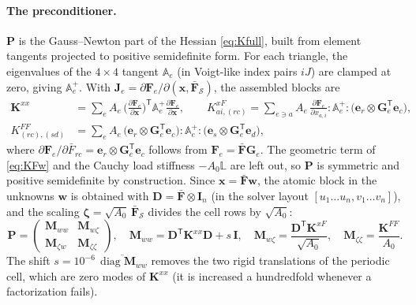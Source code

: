 \documentclass[11pt,a4paper]{article}
\newcommand{\Fb}{\bar{\mathbf F}}
\newcommand{\F}{\mathbf F}
\newcommand{\I}{\mathbf I}
\newcommand{\x}{\mathbf x}
\newcommand{\w}{\mathbf w}
\newcommand{\G}{\mathbf G}
\begin{document}
\paragraph{The preconditioner.}
\(\mathbf P\) is the Gauss--Newton part of the Hessian \eqref{eq:Kfull}, built from element tangents
projected to positive semidefinite form. For each triangle, the eigenvalues of the \(4\times4\)
tangent \(\mathbb A_e\) (in Voigt-like index pairs \(iJ\)) are clamped at zero, giving \(\mathbb A^+_e\).
With \(\mathbf J_e=\partial\F_e/\partial(\x,\Fb_{\mathcal S})\), the assembled blocks are
\begin{align}
  \mathbf K^{xx}&=\sum_eA_e\,\Big(\frac{\partial\F_e}{\partial\x}\Big)^{\mathsf T}\mathbb A^+_e
    \frac{\partial\F_e}{\partial\x},\qquad
  K^{xF}_{a i,(rc)}=\sum_{e\ni a}A_e\,\frac{\partial\F_e}{\partial x_{a,i}}:\mathbb A^+_e:
    \big(\mathbf e_r\otimes\G_e^{\mathsf T}\mathbf e_c\big),\nonumber\\
  K^{FF}_{(rc),(sd)}&=\sum_eA_e\,\big(\mathbf e_r\otimes\G_e^{\mathsf T}\mathbf e_c\big):\mathbb A^+_e:
    \big(\mathbf e_s\otimes\G_e^{\mathsf T}\mathbf e_d\big),
  \label{eq:Pblocks}
\end{align}
where \(\partial\F_e/\partial\bar F_{rc}=\mathbf e_r\otimes\G_e^{\mathsf T}\mathbf e_c\) follows from
\(\F_e=\Fb\G_e\). The geometric term of \eqref{eq:KFw} and the Cauchy load stiffness
\(-A_0\mathbb L\) are left out, so \(\mathbf P\) is symmetric and positive semidefinite by
construction. Since \(\x=\Fb\w\), the atomic block in the unknowns \(\w\) is obtained with
\(\mathbf D=\Fb\otimes\I_n\) (in the solver layout \([u_1\dots u_n,v_1\dots v_n]\)), and the scaling
\(\bm\zeta=\sqrt{A_0}\,\Fb_{\mathcal S}\) divides the cell rows by \(\sqrt{A_0}\):
\begin{equation}
  \mathbf P=\begin{pmatrix}\mathbf M_{ww}&\mathbf M_{w\zeta}\\ \mathbf M_{\zeta w}&\mathbf M_{\zeta\zeta}\end{pmatrix},\quad
  \mathbf M_{ww}=\mathbf D^{\mathsf T}\mathbf K^{xx}\mathbf D+s\,\I,\quad
  \mathbf M_{w\zeta}=\frac{\mathbf D^{\mathsf T}\mathbf K^{xF}}{\sqrt{A_0}},\quad
  \mathbf M_{\zeta\zeta}=\frac{\mathbf K^{FF}}{A_0}.
  \label{eq:Pmat}
\end{equation}
The shift \(s=10^{-6}\,\overline{\operatorname{diag}\mathbf M_{ww}}\) removes the two rigid translations
of the periodic cell, which are zero modes of \(\mathbf K^{xx}\) (it is increased a hundredfold
whenever a factorization fails).
\end{document}
